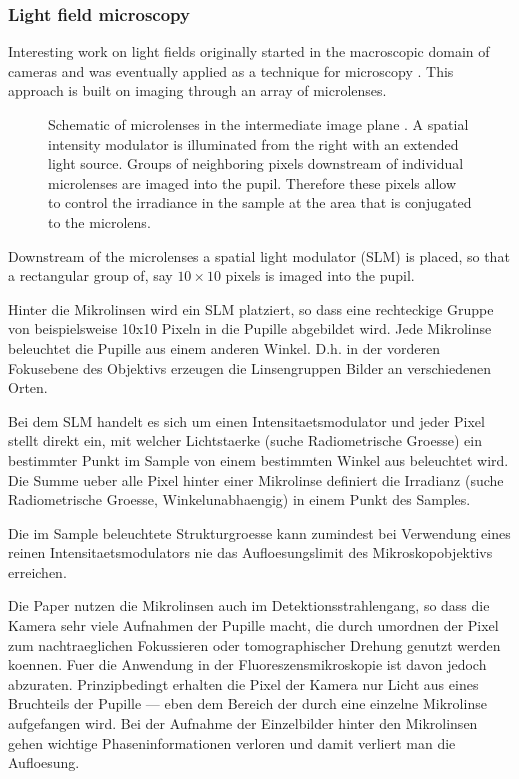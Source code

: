 \subsubsection{Light field microscopy}
\label{sec:light-field-microscopy}
Interesting work on light fields originally started in the macroscopic
domain of cameras \citep{Lippmann1908 %
} and was eventually
applied as a technique for microscopy
\citep{Levoy2006,Levoy2009,Zhang2009}. This approach is built on
imaging through an array of microlenses.
\begin{figure}[!hbt]
  \centering
  \caption{Schematic of microlenses in the intermediate image plane
    \citep[inspired from][]{Levoy2006}. A spatial intensity modulator
    is illuminated from the right with an extended light
    source. Groups of neighboring pixels downstream of individual
    microlenses are imaged into the pupil. Therefore these pixels
    allow to control the irradiance in the sample at the area that is
    conjugated to the microlens. }
  \label{fig:microlens-levoy-sketch}
\end{figure}


Downstream of the microlenses a spatial light modulator (SLM) is
placed, so that a rectangular group of, say $10\times 10$ pixels is
imaged into the pupil.


Hinter die Mikrolinsen wird ein SLM platziert, so dass eine
rechteckige Gruppe von beispielsweise 10x10 Pixeln in die Pupille
abgebildet wird. Jede Mikrolinse beleuchtet die Pupille aus einem
anderen Winkel. D.h. in der vorderen Fokusebene des Objektivs erzeugen
die Linsengruppen Bilder an verschiedenen Orten.

Bei dem SLM handelt es sich um einen Intensitaetsmodulator und jeder
Pixel stellt direkt ein, mit welcher Lichtstaerke (suche
Radiometrische Groesse) ein bestimmter Punkt im Sample von einem
bestimmten Winkel aus beleuchtet wird.  Die Summe ueber alle Pixel
hinter einer Mikrolinse definiert die Irradianz (suche Radiometrische
Groesse, Winkelunabhaengig) in einem Punkt des Samples.

Die im Sample beleuchtete Strukturgroesse kann zumindest bei
Verwendung eines reinen Intensitaetsmodulators nie das
Aufloesungslimit des Mikroskopobjektivs erreichen.


Die Paper nutzen die Mikrolinsen auch im Detektionsstrahlengang, so
dass die Kamera sehr viele Aufnahmen der Pupille macht, die durch
umordnen der Pixel zum nachtraeglichen Fokussieren oder
tomographischer Drehung genutzt werden koennen.  Fuer die Anwendung in
der Fluoreszensmikroskopie ist davon jedoch abzuraten. Prinzipbedingt
erhalten die Pixel der Kamera nur Licht aus eines Bruchteils der
Pupille --- eben dem Bereich der durch eine einzelne Mikrolinse
aufgefangen wird. Bei der Aufnahme der Einzelbilder hinter den
Mikrolinsen gehen wichtige Phaseninformationen verloren und damit
verliert man die Aufloesung.


